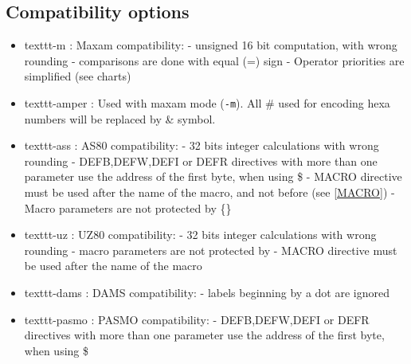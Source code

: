 \begin{xen}
\subsection{Compatibility options}
\begin{itemize}

\item texttt{-m} : Maxam compatibility:
\subitem - unsigned 16 bit computation, with wrong rounding
\subitem - comparisons are done with equal (=) sign
\subitem - Operator priorities are simplified (see charts)
\item texttt{-amper} : Used with maxam mode (\texttt{-m}). All \# used for encoding hexa numbers will be replaced by \& symbol.

\item texttt{-ass} : AS80 compatibility:
\subitem - 32 bits integer calculations with wrong rounding
\subitem - DEFB,DEFW,DEFI or DEFR directives with more than one parameter use the address of the first byte, when using \$
\subitem - MACRO directive must be used after the name of the macro, and not before (see \ref{MACRO})
\subitem - Macro parameters are not protected by \{\}

\item texttt{-uz} : UZ80 compatibility:
\subitem - 32 bits integer calculations with wrong rounding
\subitem - macro parameters are not protected by {}
\subitem - MACRO directive must be used after the name of the macro

\item texttt{-dams} : DAMS compatibility:
\subitem - labels beginning by a dot are ignored

\item texttt{-pasmo} : PASMO compatibility:
\subitem - DEFB,DEFW,DEFI or DEFR directives with more than one parameter use the address of the first byte, when using \$
\end{itemize}

\end{xen}


